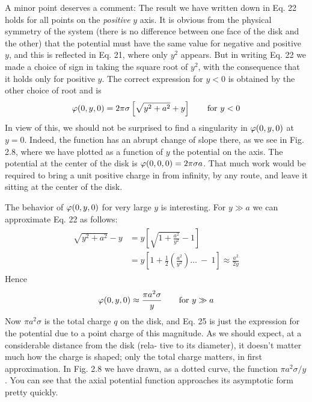 A minor point deserves a comment: The result we have written
down in Eq. 22 holds for all points on the \emph{positive} $y$ axis. It is obvious
from the physical symmetry of the system (there is no difference between
one face of the disk and the other) that the potential must have
the same value for negative and positive $y$, and this is reflected in
Eq. 21, where only $y^2$ appears. But in writing Eq. 22 we made a
choice of sign in taking the square root of $y^2$, with the consequence
that it holds only for positive $y$. The correct expression for $y < 0$ is
obtained by the other choice of root and is
\begin{equation}
  \varphi(0,y,0) = 2\pi\sigma\left[\sqrt{y^2+a^2}+y\right] \qquad \text{for $y<0$}
\end{equation}
In view of this, we should not be surprised to find a singularity in
$\varphi(0,y,0)$ at $y = 0$. Indeed, the function has an abrupt change of
slope there, as we see in Fig. 2.8, where we have plotted as a function
of $y$ the potential on the axis. The potential at the center of the disk
is $\varphi(0,0,0) = 2\pi\sigma a$. That much work would be required to bring a
unit positive charge in from infinity, by any route, and leave it sitting
at the center of the disk.

The behavior of $\varphi(0,y,0)$ for very large $y$ is interesting. For $y \gg a$
we can approximate Eq. 22 as follows:
\begin{align}
\begin{split}
  \sqrt{y^2+a^2} - y &= y \left[\sqrt{1+\frac{a^2}{y^2}}-1\right] \\
                     &= y \left[1+\frac{1}{2}\left(\frac{a^2}{y^2}\right)\ldots\:-\:1\right]
                                 \approx \frac{a^2}{2y}
\end{split}
\end{align}
Hence
\begin{equation}
  \varphi(0,y,0)\approx \frac{\pi a^2\sigma}{y} \qquad \text{for $y \gg a$}
\end{equation}
Now $\pi a^2\sigma$ is the total charge $q$ on the disk, and Eq. 25 is just the expression
for the potential due to a point charge of this magnitude.
As we should expect, at a considerable distance from the disk (rela-
tive to its diameter), it doesn't matter much how the charge is shaped;
only the total charge matters, in first approximation. In Fig. 2.8 we
have drawn, as a dotted curve, the function $\pi a^2\sigma/y$. You can see that
the axial potential function approaches its asymptotic form pretty
quickly.

